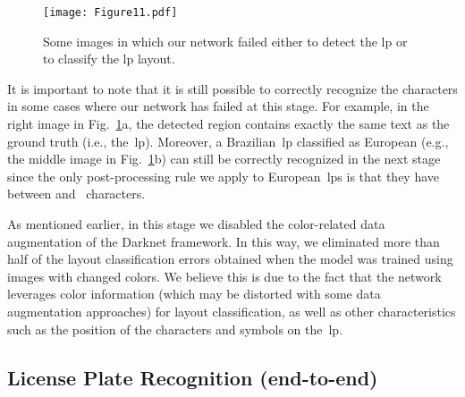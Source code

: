 \begin{figure}[!htb]
    \centering
    
    \texttt{[image: Figure11.pdf]}
    
    \vspace{-2mm}
    
    \caption[Some images in which our network failed either to detect the \gls*{lp} or to classify the \gls*{lp} layout]{Some images in which our network failed either to detect the \gls*{lp} or to classify the \gls*{lp} layout.}
    \label{fig:results:lp_detection_wrong}
\end{figure}

It is important to note that it is still possible to correctly recognize the characters in some cases where our network has failed at this stage. For example, in the right image in Fig.~\ref{fig:results:lp_detection_wrong}a, the detected region contains exactly the same text as the ground truth (i.e., the~\gls*{lp}). Moreover, a Brazilian~\gls*{lp} classified as European (e.g., the middle image in Fig.~\ref{fig:results:lp_detection_wrong}b) can still be correctly recognized in the next stage since the only post-processing rule we apply to European~\glspl*{lp} is that they have between  and ~characters.

As mentioned earlier, in this stage we disabled the color-related data augmentation of the Darknet framework. 
In this way, we eliminated more than half of the layout classification errors obtained when the model was trained using images with changed colors. 
We believe this is due to the fact that the network leverages color information (which may be distorted with some data augmentation approaches) for layout classification, as well as other characteristics such as the position of the characters and symbols on the~\gls*{lp}.

\subsection{License Plate Recognition (end-to-end)}
\label{sec:results:lp_recognition}

